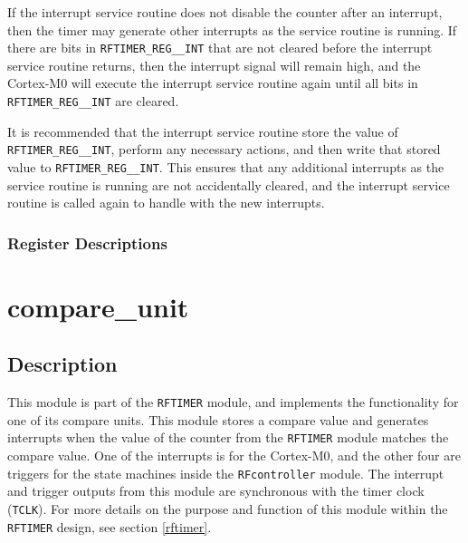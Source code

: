 If the interrupt service routine does not disable the counter after an interrupt, then the timer may generate other interrupts as the service routine is running. If there are bits in \texttt{RFTIMER\_REG\_\_INT} that are not cleared before the interrupt service routine returns, then the interrupt signal will remain high, and the Cortex-M0 will execute the interrupt service routine again until all bits in \texttt{RFTIMER\_REG\_\_INT} are cleared.

It is recommended that the interrupt service routine store the value of \texttt{RFTIMER\-\_REG\_\_INT}, perform any necessary actions, and then write that stored value to \texttt{RFTIMER\_REG\_\_INT}. This ensures that any additional interrupts as the service routine is running are not accidentally cleared, and the interrupt service routine is called again to handle with the new interrupts.

\subsubsection{Register Descriptions}

\section{compare\_unit} \label{compare-unit}
\subsection{Description}
This module is part of the \texttt{RFTIMER} module, and implements the functionality for one of its compare units. This module stores a compare value and generates interrupts when the value of the counter from the \texttt{RFTIMER} module matches the compare value. One of the interrupts is for the Cortex-M0, and the other four are triggers for the state machines inside the \texttt{RFcontroller} module. The interrupt and trigger outputs from this module are synchronous with the timer clock (\texttt{TCLK}). For more details on the purpose and function of this module within the \texttt{RFTIMER} design, see section \ref{rftimer}.

